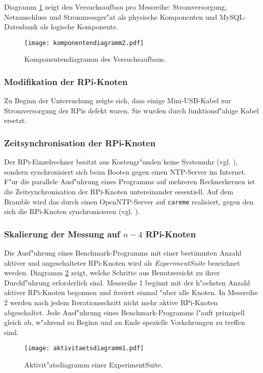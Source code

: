 Diagramm \ref{fig:Komponentendiagramm} zeigt den Versuchsaufbau pro Messreihe: Stromversorgung, Netzanschluss und Strommessger"at als physische Komponenten und MySQL-Datenbank als logische Komponente. 
\begin{figure}[htb]
  \centering
  \centerline{\texttt{[image: komponentendiagramm2.pdf]}} 
  \caption{Komponentendiagramm des Versuchsaufbaus.}
  \label{fig:Komponentendiagramm}		
\end{figure}
\subsubsection{Modifikation der RPi-Knoten}

Zu Beginn der Untersuchung zeigte sich, dass einige Mini-USB-Kabel zur Stromversorgung der RPis defekt waren. Sie wurden durch funktionsf"ahige Kabel ersetzt. 

\subsubsection{Zeitsynchronisation der RPi-Knoten} 

Der RPi-Einzelrechner besitzt aus Kostengr"unden keine Systemuhr (vgl. \cite{schmi13}), sondern synchronisiert sich beim Booten gegen einen NTP-Server im Internet. F"ur die parallele Ausf"uhrung eines Programms auf mehreren Rechnerkernen ist die Zeitsynchronisation der RPi-Knoten untereinander essentiell. Auf dem Bramble wird das durch einen OpenNTP-Server auf \texttt{careme} realisiert, gegen den sich die RPi-Knoten synchronisieren (vgl. \cite{kli13}). 

\subsubsection{Skalierung der Messung auf $n-4$ RPi-Knoten} 

Die Ausf"uhrung eines Benchmark-Programms mit einer bestimmten Anzahl aktiver und angeschalteter RPi-Knoten wird als \textit{ExperimentSuite} bezeichnet werden. Diagramm \ref{fig:Aktivitaetsdiagramm} zeigt, welche Schritte aus Benutzersicht zu ihrer Durchf"uhrung erforderlich sind. Messreihe 1 beginnt mit der h"ochsten Anzahl aktiver RPi-Knoten begonnen und iteriert einmal "uber alle Knoten. In Messreihe 2 werden nach jedem Iterationsschritt nicht mehr aktive RPi-Knoten abgeschaltet. Jede Ausf"uhrung eines Benchmark-Programms l"auft prinzipell gleich ab, w"ahrend zu Beginn und an Ende spezielle Vorkehrungen zu treffen sind.  
\begin{figure}[htb]
  \centerline{\texttt{[image: aktivitaetsdiagramm1.pdf]}} 
  \caption{Aktivit"atsdiagramm einer ExperimentSuite.}
  \label{fig:Aktivitaetsdiagramm}
\end{figure}

